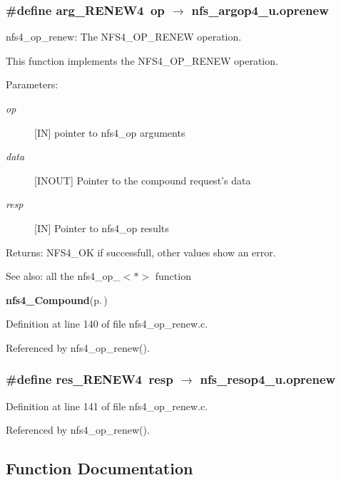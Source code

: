 \subsubsection{\setlength{\rightskip}{0pt plus 5cm}\#define arg\_\-RENEW4\ op $\rightarrow$ nfs\_\-argop4\_\-u.oprenew}\label{nfs4__op__renew_8c_a0}


nfs4\_\-op\_\-renew: The NFS4\_\-OP\_\-RENEW operation.

This function implements the NFS4\_\-OP\_\-RENEW operation.

\begin{Desc}
\item[Parameters:]
\begin{description}
\item[{\em op}][IN] pointer to nfs4\_\-op arguments \item[{\em data}][INOUT] Pointer to the compound request's data \item[{\em resp}][IN] Pointer to nfs4\_\-op results\end{description}
\end{Desc}
\begin{Desc}
\item[Returns:]NFS4\_\-OK if successfull, other values show an error.\end{Desc}
\begin{Desc}
\item[See also:]all the nfs4\_\-op\_\-$<$$\ast$$>$ function 

{\bf nfs4\_\-Compound}{\rm (p.\,\pageref{nfs4__Compound_8c_a4})} \end{Desc}


Definition at line 140 of file nfs4\_\-op\_\-renew.c.

Referenced by nfs4\_\-op\_\-renew().
\subsubsection{\setlength{\rightskip}{0pt plus 5cm}\#define res\_\-RENEW4\ resp $\rightarrow$ nfs\_\-resop4\_\-u.oprenew}\label{nfs4__op__renew_8c_a1}




Definition at line 141 of file nfs4\_\-op\_\-renew.c.

Referenced by nfs4\_\-op\_\-renew().

\subsection{Function Documentation}
